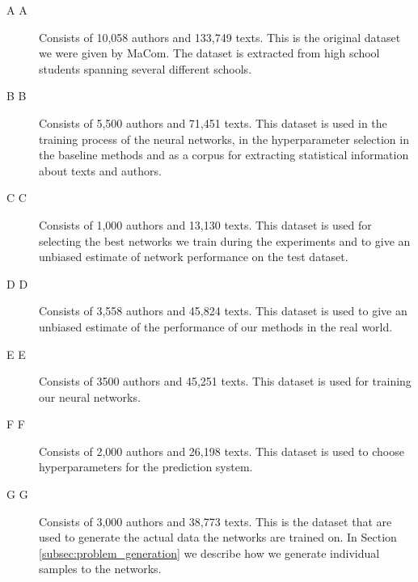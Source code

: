 \begin{description}

    \item[\glsdesc{A} \gls{A}]

        Consists of 10,058 authors and 133,749 texts. This is the original
        dataset we were given by MaCom. The dataset is extracted from high
        school students spanning several different schools.

    \item[\glsdesc{B} \gls{B}]

        Consists of 5,500 authors and 71,451 texts. This dataset is used in the
        training process of the neural networks, in the hyperparameter selection
        in the baseline methods and as a corpus for extracting statistical
        information about texts and authors.

    \item[\glsdesc{C} \gls{C}]

        Consists of 1,000 authors and 13,130 texts. This dataset is used for
        selecting the best networks we train during the experiments and to give
        an unbiased estimate of network performance on the test dataset.

    \item[\glsdesc{D} \gls{D}]

        Consists of 3,558 authors and 45,824 texts. This dataset is used to
        give an unbiased estimate of the performance of our methods in the real
        world.

    \item[\glsdesc{E} \gls{E}]

        Consists of 3500 authors and 45,251 texts. This dataset is used for
        training our neural networks.

    \item[\glsdesc{F} \gls{F}]

        Consists of 2,000 authors and 26,198 texts. This dataset is used to
        choose hyperparameters for the prediction system.

    \item[\glsdesc{G} \gls{G}]

        Consists of 3,000 authors and 38,773 texts. This is the dataset that are
        used to generate the actual data the networks are trained on. In Section
        \ref{subsec:problem_generation} we describe how we generate individual
        samples to the networks.


\end{description}
